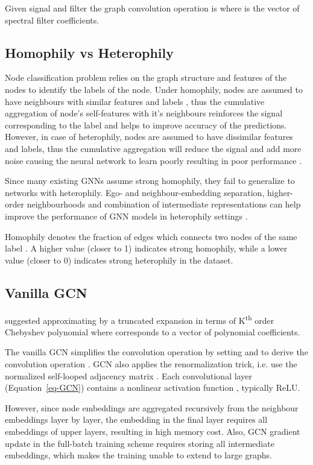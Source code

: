 \documentclass{article}
\begin{document}
Given signal  and filter  the graph convolution operation is  where  is the vector of spectral filter coefficients.

\subsection{Homophily vs Heterophily} \label{Homophily}
Node classification problem relies on the graph structure and features of the nodes to identify the labels of the node. Under homophily, nodes are assumed to have neighbours with similar features and labels \cite{liu2020non}, thus the cumulative aggregation of node’s self-features with it's neighbours reinforces the signal corresponding to the label and helps to improve accuracy of the predictions. However, in case of heterophily, nodes are assumed to have dissimilar features and labels, thus the cumulative aggregation will reduce the signal and add more noise causing the neural network to learn poorly resulting in poor performance \cite{maurya2021improving, zhu2020beyond}. 

Since many existing GNNs assume strong homophily, they fail to generalize to networks with heterophily. Ego- and neighbour-embedding separation, higher-order neighbourhoods and combination of intermediate representations can help improve the performance of GNN models in heterophily settings \cite{zhu2020beyond}. 

Homophily  denotes the fraction of edges which connects two nodes of the same label \cite{liu2020non}. A higher value (closer to 1) indicates strong homophily, while a lower value (closer to 0) indicates strong heterophily in the dataset.

\subsection{Vanilla GCN} \label{GCN}
\citet{hammond2011wavelets} suggested approximating  by a truncated expansion in terms of  K\textsuperscript{th} order Chebyshev polynomial where  corresponds to a vector of polynomial coefficients. 


The vanilla GCN \cite{kipf2016semi} simplifies the convolution operation by setting  and  to derive the convolution operation . GCN also applies the renormalization trick, i.e. use the normalized self-looped adjacency matrix . Each convolutional layer (Equation~\ref{eq-GCN}) contains a nonlinear
activation function , typically ReLU.

 

However, since node embeddings are aggregated recursively from the neighbour embeddings layer by layer, the embedding in the final layer requires all embeddings of upper layers, resulting in high memory cost. Also, GCN gradient update in the full-batch training scheme requires storing all intermediate embeddings, which makes the training unable to extend to large graphs. 
\end{document}
